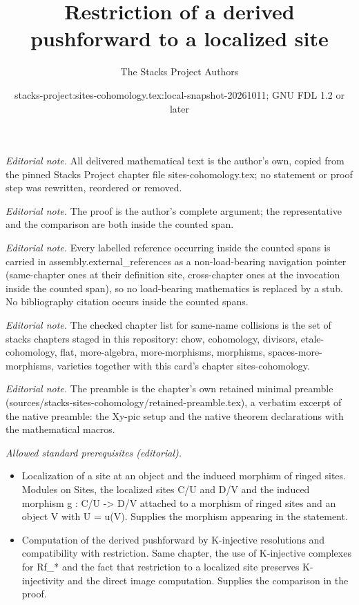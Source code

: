 \documentclass[10pt,a4paper]{amsart}
\title{Restriction of a derived pushforward to a localized site}
\author{The Stacks Project Authors}
\date{stacks-project:sites-cohomology.tex:local-snapshot-20261011; GNU FDL 1.2 or later}
\theoremstyle{plain}
\theoremstyle{definition}
\theoremstyle{remark}
\numberwithin{equation}{subsection}
\begin{document}
\maketitle
\noindent\textit{Editorial note.} All delivered mathematical text is the author's own, copied from the pinned Stacks Project chapter file sites-cohomology.tex; no statement or proof step was rewritten, reordered or removed.\par\medskip
\noindent\textit{Editorial note.} The proof is the author's complete argument; the representative and the comparison are both inside the counted span.\par\medskip
\noindent\textit{Editorial note.} Every labelled reference occurring inside the counted spans is carried in assembly.external\_references as a non-load-bearing navigation pointer (same-chapter ones at their definition site, cross-chapter ones at the invocation inside the counted span), so no load-bearing mathematics is replaced by a stub. No bibliography citation occurs inside the counted spans.\par\medskip
\noindent\textit{Editorial note.} The checked chapter list for same-name collisions is the set of stacks chapters staged in this repository: chow, cohomology, divisors, etale-cohomology, flat, more-algebra, more-morphisms, morphisms, spaces-more-morphisms, varieties together with this card's chapter sites-cohomology.\par\medskip
\noindent\textit{Editorial note.} The preamble is the chapter's own retained minimal preamble (sources/stacks-sites-cohomology/retained-preamble.tex), a verbatim excerpt of the native preamble: the Xy-pic setup and the native theorem declarations with the mathematical macros.\par\medskip
\noindent\textit{Allowed standard prerequisites (editorial).}\begin{itemize}
\item Localization of a site at an object and the induced morphism of ringed sites. Modules on Sites, the localized sites C/U and D/V and the induced morphism g : C/U -> D/V attached to a morphism of ringed sites and an object V with U = u(V). Supplies the morphism appearing in the statement.
\item Computation of the derived pushforward by K-injective resolutions and compatibility with restriction. Same chapter, the use of K-injective complexes for Rf\_* and the fact that restriction to a localized site preserves K-injectivity and the direct image computation. Supplies the comparison in the proof.
\end{itemize}\medskip
\end{document}

